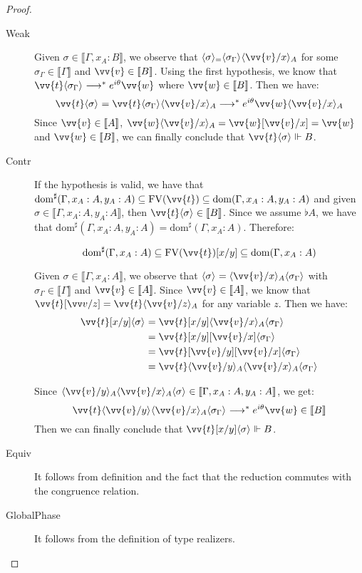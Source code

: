 \documentclass[runningheads,orivec,envcountsame,envcountsect]{llncs}
\newcommand\lra{\longrightarrow}
\newcommand\ansubst[2]{\ensuremath{\langle #1 \rangle_{#2}}}
\newcommand\dom[1]{\mathrm{dom}(#1)}
\newcommand\sdom[1]{\mathrm{dom}^{\sharp}(#1)}
\newcommand\FV[1]{\mathrm{FV}(#1)}
\def\eval{\lra^*}
\def\sem#1{\llbracket#1\rrbracket}
\def\real{\Vdash}
\begin{document}
\begin{proof}
\begin{description}
    \item[Weak] Given $\sigma\in\sem{\Gamma,x_A:B}$, we observe that $\ansubst{\sigma}=\ansubst{\sigma_\Gamma}{}\ansubst{\vv{v}/x}{A}$ for some $\sigma_\Gamma\in\sem{\Gamma}$ and $\vv{v}\in\sem{B}$. Using the first hypothesis, we know that $\vv{t}\ansubst{\sigma_\Gamma}{}\eval e^{i\theta}\vv{w}$ where $\vv{w}\in\sem{B}$. Then we have:
    \[
    \vv{t}\ansubst{\sigma}{}=\vv{t}\ansubst{\sigma_\Gamma}{}\ansubst{\vv{v}/x}{A}\eval e^{i\theta}\vv{w}\ansubst{\vv{v}/x}{A}
    \]
    Since $\vv{v}\in\sem{A}$, $\vv{w}\ansubst{\vv{v}/x}{A}=\vv{w}[\vv{v}/x]=\vv{w}$ and $\vv{w}\in\sem{B}$, we can finally conclude that $\vv{t}\ansubst{\sigma}{}\real B$.

    \item[Contr] If the hypothesis is valid, we have that $\sdom{\Gamma, x_A:A, y_A:A}\subseteq\FV{\vv{t}}\subseteq\dom{\Gamma,x_A:A, y_A:A}$ and given $\sigma\in\sem{\Gamma,x_A:A, y_A:A}$, then $\vv{t}\ansubst{\sigma}{}\in\sem{B}$. Since we assume $\flat A$, we have that $\sdom{\Gamma,x_A:A, y_A:A}=\sdom{\Gamma,x_A:A}$. Therefore:
    
    \[
    \sdom{\Gamma,x_A:A}\subseteq\FV{\vv{t}}[x/y]\subseteq\dom{\Gamma,x_A:A}
    \]

    Given $\sigma\in\sem{\Gamma,x_A:A}$, we observe that $\ansubst{\sigma}{}=\ansubst{\vv{v}/x}{A}\ansubst{\sigma_\Gamma}{}$ with $\sigma_\Gamma\in\sem{\Gamma}$ and $\vv{v}\in\sem{A}$. Since $\vv{v}\in\sem{A}$, we know that $\vv{t}[\vv v/z] =\vv{t}\ansubst{\vv{v}/z}{A}$ for any variable $z$. Then we have:
    \begin{align*}
        \vv{t}[x/y]\ansubst{\sigma}{} &= \vv{t}[x/y]\ansubst{\vv{v}/x}{A}\ansubst{\sigma_\Gamma}{}\\
        &=\vv{t}[x/y][\vv{v}/x]\ansubst{\sigma_\Gamma}{}\\
        &=\vv{t}[\vv{v}/y][\vv{v}/x]\ansubst{\sigma_\Gamma}{}\\
        &=\vv{t}\ansubst{\vv{v}/y}{A}\ansubst{\vv{v}/x}{A}\ansubst{\sigma_\Gamma}{}    
    \end{align*}
    
    Since $\ansubst{\vv{v}/y}{A}\ansubst{\vv{v}/x}{A}\ansubst{\sigma}{}\in\sem{\Gamma,x_A:A,y_A:A}$, we get:
    \[\vv{t}\ansubst{\vv{v}/y}{}\ansubst{\vv{v}/x}{A}\ansubst{\sigma_\Gamma}{}\eval e^{i\theta}\vv{w}\in\sem{B}\]
    Then we can finally conclude that $\vv{t}[x/y]\ansubst{\sigma}{}\real B$.

    \item[Equiv] It follows from definition and the fact that the reduction commutes with the congruence relation.
    
    \item[GlobalPhase] It follows from the definition of type realizers.
    \end{description}
\end{proof}
\end{document}
